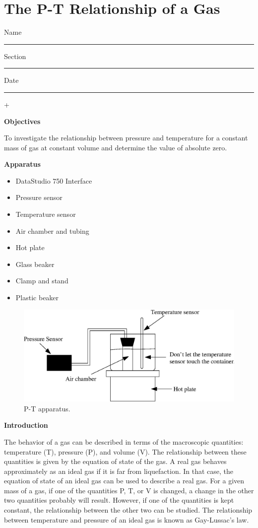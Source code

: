 
\section{The P-T Relationship of a Gas}

Name \rule{2.0in}{0.1pt}\hfill{}Section \rule{1.0in}{0.1pt}\hfill{}Date
\rule{1.0in}{0.1pt}+

\textbf{Objectives} 

To investigate the relationship between pressure and temperature for
a constant mass of gas at constant volume and determine the value
of absolute zero.

\textbf{Apparatus} 

\begin{itemize}
\item DataStudio 750 Interface
\item Pressure sensor
\item Temperature sensor
\item Air chamber and tubing
\item Hot plate
\item Glass beaker
\item Clamp and stand
\item Plastic beaker
\end{itemize}
\vspace{0.3cm}

\begin{figure}[hbt]
\begin{center}
\includegraphics[width=6.0in]{P-T_fig1b.eps}
\caption{P-T apparatus.}
\end{center}
\end{figure}

\textbf{Introduction}

The behavior of a gas can be described in terms of the macroscopic quantities:
temperature (T), pressure (P), and volume (V). The relationship between these
quantities is given by the equation of state of the gas. A real gas behaves
approximately as an ideal gas if it is far from liquefaction. In that case,
the equation of state of an ideal gas can be used to describe a real gas. For
a given mass of a gas, if one of the quantities P, T, or V is changed, a change
in the other two quantities probably will result. However, if one of the 
quantities is kept constant, the relationship between the other two can be 
studied. The relationship between temperature and pressure of an ideal gas is 
known as Gay-Lussac's law.

